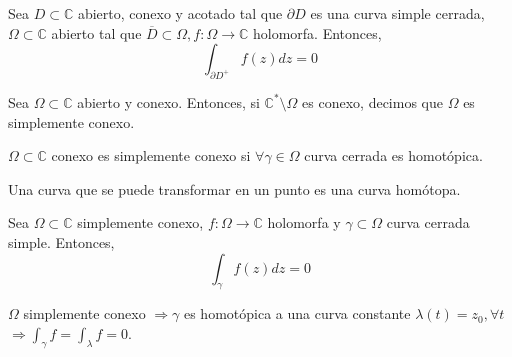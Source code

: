 \begin{theo}
  Sea $D \subset \mathbb{C}$ abierto, conexo y acotado tal que $\partial D$ es una curva simple cerrada, $\Omega \subset \mathbb{C}$ abierto tal que $\overline{D} \subset \Omega, f: \Omega \to \mathbb{C}$ holomorfa. Entonces, 
  \[ 
    \int_{\partial D^+}^{} f(z) dz = 0 
  \] 
\end{theo}

\begin{defn}
  Sea $\Omega \subset \mathbb{C}$ abierto y conexo. Entonces, si $\mathbb{C}^* \setminus \Omega$ es conexo, decimos que $\Omega$ es simplemente conexo.
\end{defn}

\begin{obs}
  $\Omega \subset \mathbb{C}$ conexo es simplemente conexo si $\forall \gamma \in \Omega$ curva cerrada es homotópica.
\end{obs}


\begin{prop}
  Una curva que se puede transformar en un punto es una curva homótopa.
\end{prop}

\begin{theo}
  Sea $\Omega \subset \mathbb{C}$ simplemente conexo, $f: \Omega \to \mathbb{C}$  holomorfa y $\gamma \subset \Omega$ curva cerrada simple. Entonces, 
  \[ 
    \int_{\gamma}^{} f(z) dz = 0 
  \] 
\end{theo}

\begin{dem}
  $\Omega$ simplemente conexo $\Rightarrow \gamma$ es homotópica a una curva constante $\lambda(t) = z_{0}, \forall t$ $\Rightarrow \int_{\gamma}^{} f = \int_{\lambda}^{} f = 0$.
\end{dem}
